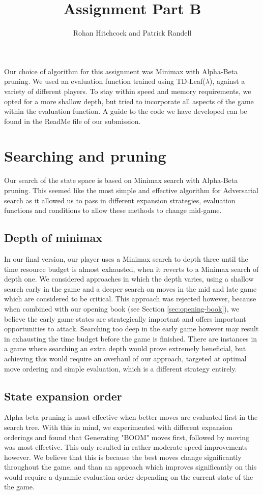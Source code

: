 \documentclass[11pt]{article}
\newcommand{\drafting}[1]{\textcolor{OliveGreen}{#1}}
\begin{document}
\title{\textbf{Assignment Part B}}
\author{Rohan Hitchcock and Patrick Randell}
\date{}
\maketitle

\drafting{
Our choice of algorithm for this assignment was Minimax with Alpha-Beta pruning. We used an evaluation function trained using TD-Leaf($\lambda$), against a variety of different players.
To stay within speed and memory requirements, we opted for a more shallow depth, but tried to incorporate all aspects of the game within the evaluation function. A guide to the code we have developed can be found in the ReadMe file of our submission.
}

\section{Searching and pruning}
Our search of the state space is based on Minimax search with Alpha-Beta pruning. \drafting{This seemed like the most simple and effective algorithm for Adversarial search as it allowed us to pass in different expansion strategies, evaluation functions and conditions to allow these methods to change mid-game.}

\subsection{Depth of minimax}
In our final version, our player uses a Minimax search to depth three until the time resource budget is almost exhausted, when it reverts to a Minimax search of depth one. We considered approaches in which the depth varies, using a shallow search early in the game and a deeper search on moves in the mid and late game which are considered to be critical. This approach was rejected however, because when combined with our opening book (see Section \ref{sec:opening-book}), we believe the early game states are strategically important and offers important opportunities to attack. Searching too deep in the early game however may result in exhausting the time budget before the game is finished. \drafting{There are instances in a game where searching an extra depth would prove extremely beneficial, but achieving this would require an overhaul of our approach, targeted at optimal move ordering and simple evaluation, which is a different strategy entirely.}

\subsection{State expansion order}
Alpha-beta pruning is most effective when better moves are evaluated first in the search tree. With this in mind, we experimented with different expansion orderings and found that \drafting{Generating "BOOM" moves first, followed by moving} was most effective. This only resulted in rather moderate speed improvements however. We believe that this is because the best moves change significantly throughout the game, and than an approach which improves significantly on this would require a dynamic evaluation order depending on the current state of the the game.
\end{document}
